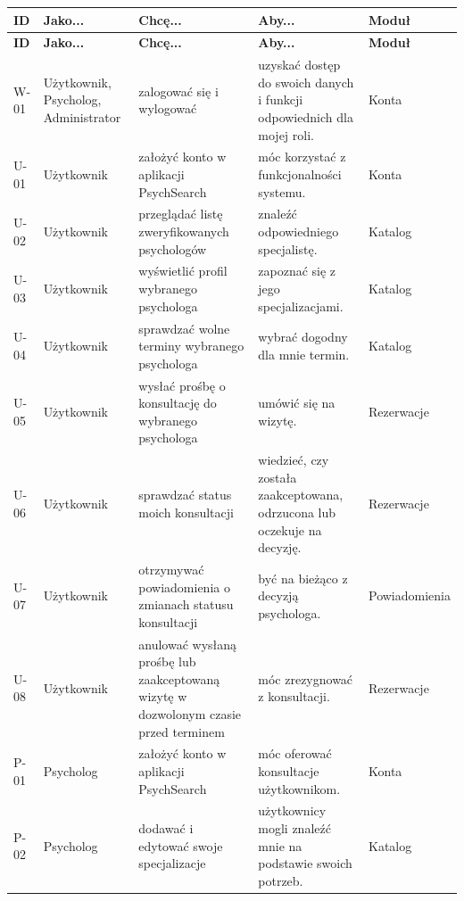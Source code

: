 \documentclass[11pt,a4paper]{article}
\newcommand{\naglowek}{
\hline
\textbf{ID} &
\textbf{Jako...} &
\textbf{Chcę...} &
\textbf{Aby...} &
\textbf{Moduł} \\
\hline
}
\begin{document}
\small
\begin{xltabular}{\textwidth}{|p{1.1cm}|p{2.2cm}|Y|Y|p{2.4cm}|}
 
\naglowek
\endfirsthead
 
\naglowek
\endhead
 
W-01 &
Użytkownik, Psycholog, Administrator &
zalogować się i wylogować &
uzyskać dostęp do swoich danych
i funkcji odpowiednich dla mojej roli. &
Konta \\
 
 
U-01 &
Użytkownik &
założyć konto w aplikacji PsychSearch &
móc korzystać z funkcjonalności systemu. &
Konta \\
\hline
 
U-02 &
Użytkownik &
przeglądać listę zweryfikowanych psychologów &
znaleźć odpowiedniego specjalistę. &
Katalog \\
\hline
 
U-03 &
Użytkownik &
wyświetlić profil wybranego psychologa &
zapoznać się z jego specjalizacjami. &
Katalog \\
\hline
 
U-04 &
Użytkownik &
sprawdzać wolne terminy wybranego psychologa &
wybrać dogodny dla mnie termin. &
Katalog \\
\hline
 
U-05 &
Użytkownik &
wysłać prośbę o konsultację
do wybranego psychologa &
umówić się na wizytę. &
Rezerwacje \\
\hline
 
U-06 &
Użytkownik &
sprawdzać status moich konsultacji &
wiedzieć, czy została zaakceptowana,
odrzucona lub oczekuje na decyzję. &
Rezerwacje \\
\hline
 
U-07 &
Użytkownik &
otrzymywać powiadomienia o zmianach
statusu konsultacji &
być na bieżąco z decyzją psychologa. &
Powiadomienia \\
\hline
 
U-08 &
Użytkownik &
anulować wysłaną prośbę lub zaakceptowaną
wizytę w dozwolonym czasie przed terminem &
móc zrezygnować z konsultacji. &
Rezerwacje \\
 
 
P-01 &
Psycholog &
założyć konto w aplikacji PsychSearch &
móc oferować konsultacje użytkownikom. &
Konta \\
\hline
 
P-02 &
Psycholog &
dodawać i edytować swoje specjalizacje &
użytkownicy mogli znaleźć mnie
na podstawie swoich potrzeb. &
Katalog \\
\hline
 

\end{xltabular}
\end{document}
